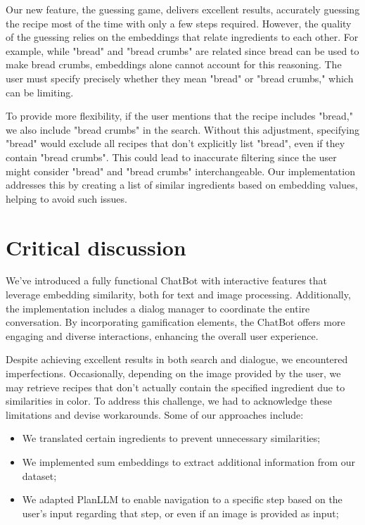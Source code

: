 \documentclass[runningheads]{llncs}
\begin{document}
Our new feature, the guessing game, delivers excellent results, accurately guessing the recipe most of the time with only a few steps required. However, the quality of the guessing relies on the embeddings that relate ingredients to each other. For example, while "bread" and "bread crumbs" are related since bread can be used to make bread crumbs, embeddings alone cannot account for this reasoning. The user must specify precisely whether they mean "bread" or "bread crumbs," which can be limiting.

To provide more flexibility, if the user mentions that the recipe includes "bread," we also include "bread crumbs" in the search. Without this adjustment, specifying "bread" would exclude all recipes that don't explicitly list "bread", even if they contain "bread crumbs". This could lead to inaccurate filtering since the user might consider "bread" and "bread crumbs" interchangeable. Our implementation addresses this by creating a list of similar ingredients based on embedding values, helping to avoid such issues.

\section{Critical discussion}
We've introduced a fully functional ChatBot with interactive features that leverage embedding similarity, both for text and image processing. Additionally, the implementation includes a dialog manager to coordinate the entire conversation. By incorporating gamification elements, the ChatBot offers more engaging and diverse interactions, enhancing the overall user experience.

Despite achieving excellent results in both search and dialogue, we encountered imperfections. Occasionally, depending on the image provided by the user, we may retrieve recipes that don't actually contain the specified ingredient due to similarities in color. To address this challenge, we had to acknowledge these limitations and devise workarounds. Some of our approaches include:

\begin{itemize}
	\item We translated certain ingredients to prevent unnecessary similarities;
	\item We implemented sum embeddings to extract additional information from our dataset;
	\item We adapted PlanLLM to enable navigation to a specific step based on the user's input regarding that step, or even if an image is provided as input;
\end{itemize}
\end{document}
